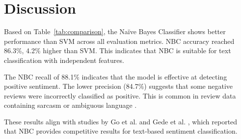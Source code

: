 \section{Discussion}

Based on Table~\ref{tab:comparison}, the Na\"ive Bayes Classifier shows better performance than SVM across all evaluation metrics. NBC accuracy reached 86.3\%, 4.2\% higher than SVM. This indicates that NBC is suitable for text classification with independent features.

The NBC recall of 88.1\% indicates that the model is effective at detecting positive sentiment. The lower precision (84.7\%) suggests that some negative reviews were incorrectly classified as positive. This is common in review data containing sarcasm or ambiguous language \cite{gewang2022}.

These results align with studies by Go et al. \cite{go2019} and Gede et al. \cite{gewang2022}, which reported that NBC provides competitive results for text-based sentiment classification.
